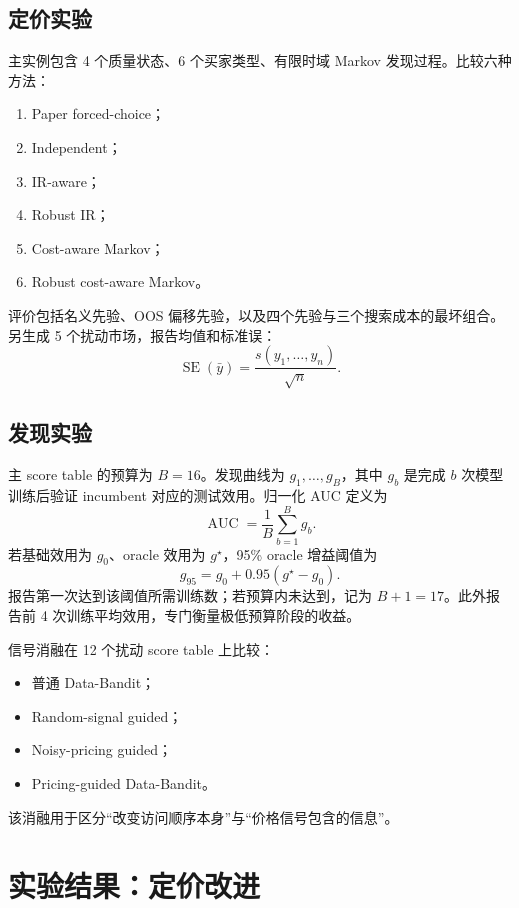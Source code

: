 \documentclass[11pt,a4paper]{ctexart}
\begin{document}
\subsection{定价实验}

主实例包含 4 个质量状态、6 个买家类型、有限时域 Markov 发现过程。比较六种方法：

\begin{enumerate}
  \item Paper forced-choice；
  \item Independent；
  \item IR-aware；
  \item Robust IR；
  \item Cost-aware Markov；
  \item Robust cost-aware Markov。
\end{enumerate}

评价包括名义先验、OOS 偏移先验，以及四个先验与三个搜索成本的最坏组合。另生成 5 个扰动市场，报告均值和标准误：
\[
\operatorname{SE}(\bar y)=\frac{s(y_1,\ldots,y_n)}{\sqrt n}.
\]

\subsection{发现实验}

主 score table 的预算为 $B=16$。发现曲线为 $g_1,\ldots,g_B$，其中 $g_b$ 是完成 $b$ 次模型训练后验证 incumbent 对应的测试效用。归一化 AUC 定义为
\[
\operatorname{AUC}=\frac1B\sum_{b=1}^{B}g_b.
\]
若基础效用为 $g_0$、oracle 效用为 $g^\star$，95\% oracle 增益阈值为
\[
g_{95}=g_0+0.95(g^\star-g_0).
\]
报告第一次达到该阈值所需训练数；若预算内未达到，记为 $B+1=17$。此外报告前 4 次训练平均效用，专门衡量极低预算阶段的收益。

信号消融在 12 个扰动 score table 上比较：

\begin{itemize}
  \item 普通 Data-Bandit；
  \item Random-signal guided；
  \item Noisy-pricing guided；
  \item Pricing-guided Data-Bandit。
\end{itemize}

该消融用于区分“改变访问顺序本身”与“价格信号包含的信息”。

\section{实验结果：定价改进}
\end{document}
